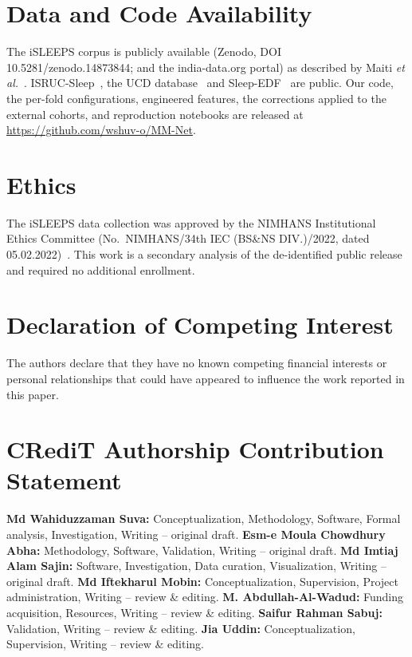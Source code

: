 \documentclass[a4paper,fleqn]{cas-sc}
\begin{document}
\section*{Data and Code Availability}
The iSLEEPS corpus is publicly available (Zenodo, DOI 10.5281/zenodo.14873844; and the
india-data.org portal) as described by Maiti \textit{et al.}~\cite{maiti2026isleeps}.
ISRUC-Sleep~\cite{khalighi2016isruc}, the UCD database~\cite{ucddb2007} and
Sleep-EDF~\cite{kemp2000sleepedf} are public. Our code, the per-fold configurations,
engineered features, the corrections applied to the external cohorts, and reproduction
notebooks are released at
\url{https://github.com/wshuv-o/MM-Net}.

\section*{Ethics}
The iSLEEPS data collection was approved by the NIMHANS Institutional Ethics Committee
(No.\ NIMHANS/34th IEC (BS\&NS DIV.)/2022, dated 05.02.2022)~\cite{maiti2026isleeps}. This work
is a secondary analysis of the de-identified public release and required no additional
enrollment.

\section*{Declaration of Competing Interest}
The authors declare that they have no known competing financial interests or personal
relationships that could have appeared to influence the work reported in this paper.

\section*{CRediT Authorship Contribution Statement}
\textbf{Md Wahiduzzaman Suva:} Conceptualization, Methodology, Software, Formal analysis,
Investigation, Writing -- original draft. \textbf{Esm-e Moula Chowdhury Abha:} Methodology,
Software, Validation, Writing -- original draft. \textbf{Md Imtiaj Alam Sajin:} Software,
Investigation, Data curation, Visualization, Writing -- original draft. \textbf{Md Iftekharul
Mobin:} Conceptualization, Supervision, Project administration, Writing -- review \& editing.
\textbf{M. Abdullah-Al-Wadud:} Funding acquisition, Resources, Writing -- review \& editing.
\textbf{Saifur Rahman Sabuj:} Validation, Writing -- review \& editing. \textbf{Jia Uddin:}
Conceptualization, Supervision, Writing -- review \& editing.
\end{document}
